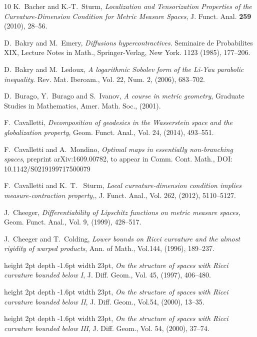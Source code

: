 \documentclass[11pt,reqno]{amsart}
\theoremstyle{definition}
\theoremstyle{remark}
\theoremstyle{remark}
\theoremstyle{remark}
\theoremstyle{remark}
\theoremstyle{remark}
\theoremstyle{remark}
\theoremstyle{remark}
\begin{document}
\begin{thebibliography}{10}
  {\sc K.~Bacher and K.-T.~Sturm},
  {\em Localization and Tensorization Properties of the Curvature-Dimension Condition for Metric Measure Spaces},
  J. Funct. Anal. \textbf{259} (2010), 28--56.

{\sc D.~Bakry and M.~Emery},
{\em Diffusions hypercontractives}. Seminaire de Probabilites XIX, Lecture Notes in Math., Springer-Verlag, New York. 1123 (1985), 177--206.

{\sc D.~Bakry and M.~Ledoux},
{\em A logarithmic Sobolev form of the Li-Yau parabolic inequality}. Rev. Mat. Iberoam.,
Vol. 22,  Num. 2, (2006), 683--702. 

{\sc D.~Burago, Y.~Burago and S.~Ivanov},
{\em A course in metric geometry},
Graduate Studies in Mathematics, Amer. Math. Soc., (2001).


{\sc F.~Cavalletti},
{\em Decomposition of geodesics in the Wasserstein space and the globalization property},
Geom. Funct. Anal., Vol. 24, (2014), 493--551.    


{\sc F.~Cavalletti and A.~Mondino},
{\em Optimal maps in essentially non-branching spaces},
preprint arXiv:1609.00782, to appear in Comm. Cont. Math., DOI: 10.1142/S0219199717500079
 
{\sc F.~Cavalletti and K.~T. ~Sturm},
{\em  Local curvature-dimension condition implies measure-contraction property,},
J. Funct. Anal.,  Vol. 262, (2012),  5110--5127.
 
 
 
 
{\sc J.~Cheeger},
{\em Differentiability of Lipschitz functions on metric measure spaces,} Geom.
Funct. Anal., Vol. 9, (1999), 428--517.

 
{\sc J.~Cheeger and T.~Colding},
{\em Lower bounds on Ricci curvature and the almost rigidity of warped products},
 Ann. of Math., Vol.{144}, (1996), 189--237.

\leavevmode\vrule height 2pt depth -1.6pt width 23pt,
 {\em On the structure of spaces with {R}icci
  curvature bounded below {I}}, J. Diff. Geom., Vol. 45, (1997), 406--480.

\leavevmode\vrule height 2pt depth -1.6pt width 23pt, 
{\em On the structure of
  spaces with {R}icci curvature bounded below {II}}, J. Diff. Geom., Vol.54, (2000),
  13--35.

\leavevmode\vrule height 2pt depth -1.6pt width 23pt, 
{\em On the structure of
  spaces with {R}icci curvature bounded below {III}}, J. Diff. Geom., Vol. 54,
  (2000), 37--74.


\end{thebibliography}
\end{document}
